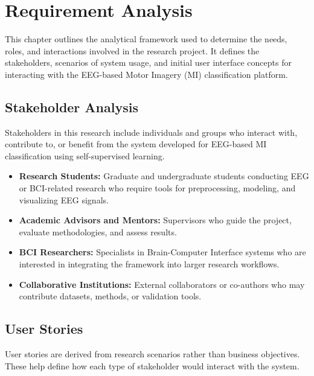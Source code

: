 \chapter{Requirement Analysis}
\label{ch:requirement-analysis}

This chapter outlines the analytical framework used to determine the needs, roles, and interactions involved in the research project. It defines the stakeholders, scenarios of system usage, and initial user interface concepts for interacting with the EEG-based Motor Imagery (MI) classification platform.


\section{Stakeholder Analysis}
\label{sec:stakeholder-analysis}

Stakeholders in this research include individuals and groups who interact with, contribute to, or benefit from the system developed for EEG-based MI classification using self-supervised learning.

\begin{itemize}
    \item \textbf{Research Students:} Graduate and undergraduate students conducting EEG or BCI-related research who require tools for preprocessing, modeling, and visualizing EEG signals.
    \item \textbf{Academic Advisors and Mentors:} Supervisors who guide the project, evaluate methodologies, and assess results.
    \item \textbf{BCI Researchers:} Specialists in Brain-Computer Interface systems who are interested in integrating the framework into larger research workflows.
    \item \textbf{Collaborative Institutions:} External collaborators or co-authors who may contribute datasets, methods, or validation tools.
\end{itemize}


\section{User Stories}
\label{sec:user-stories}

User stories are derived from research scenarios rather than business objectives.
These help define how each type of stakeholder would interact with the system.

